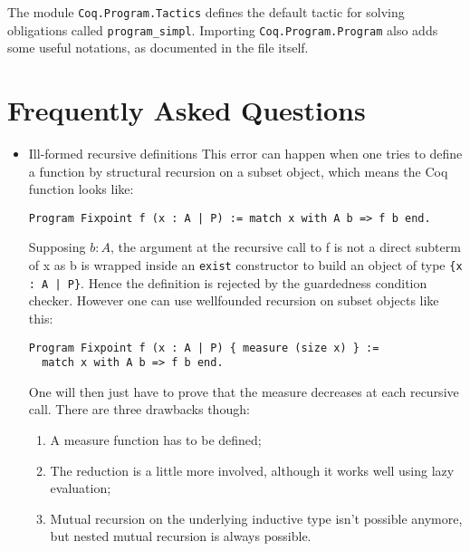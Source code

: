 The module {\tt Coq.Program.Tactics} defines the default tactic for solving
obligations called {\tt program\_simpl}. Importing 
{\tt Coq.Program.Program} also adds some useful notations, as documented in the file itself.

\section{Frequently Asked Questions
  \label{ProgramFAQ}}

\begin{itemize}
\item {Ill-formed recursive definitions}
  This error can happen when one tries to define a
  function by structural recursion on a subset object, which means the Coq
  function looks like:
  
  \verb$Program Fixpoint f (x : A | P) := match x with A b => f b end.$
  
  Supposing $b : A$, the argument at the recursive call to f is not a
  direct subterm of x as b is wrapped inside an {\tt exist} constructor to build
  an object of type \verb${x : A | P}$.  Hence the definition is rejected
  by the guardedness condition checker. However one can use
  wellfounded recursion on subset objects like this:
  
\begin{verbatim}
Program Fixpoint f (x : A | P) { measure (size x) } :=
  match x with A b => f b end.
\end{verbatim}
  
  One will then just have to prove that the measure decreases at each recursive
  call. There are three drawbacks though: 
  \begin{enumerate}
  \item A measure function has to be defined;
  \item The reduction is a little more involved, although it works well
    using lazy evaluation;
  \item Mutual recursion on the underlying inductive type isn't possible
    anymore, but nested mutual recursion is always possible.
  \end{enumerate}
\end{itemize}

